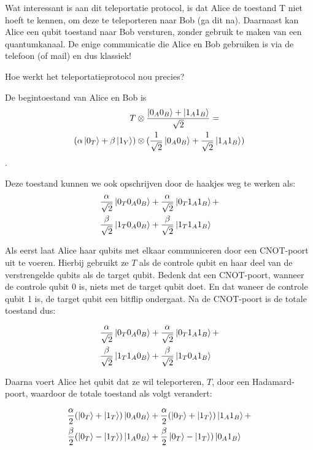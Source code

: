 \documentclass[../../main.tex]{subfiles}
\begin{document}
Wat interessant is aan dit teleportatie protocol, is dat Alice de toestand T niet hoeft te kennen, om deze te teleporteren naar Bob (ga dit na). Daarnaast kan Alice een qubit toestand naar Bob versturen, zonder gebruik te maken van een quantumkanaal. De enige communicatie die Alice en Bob gebruiken is via de telefoon (of mail) en dus klassiek!

Hoe werkt het teleportatieprotocol nou precies?

De begintoestand van Alice en Bob is
\begin{align*}
T &\otimes \frac{\ket{0_A0_B}+\ket{1_A1_B}}{\sqrt{2}}=\\ 
(\alpha\ket{0_T}+\beta\ket{1_Y}) &\otimes (\frac{1}{\sqrt{2}}\ket{0_A0_B}+\frac{1}{\sqrt{2}}\ket{1_A1_B})
\end{align*}.

Deze toestand kunnen we ook opschrijven door de haakjes weg te werken als:
\begin{align*}
\frac{\alpha}{\sqrt{2}}\ket{0_T0_A0_B} &+
\frac{\alpha}{\sqrt{2}}\ket{0_T1_A1_B} +\\
\frac{\beta}{\sqrt{2}}\ket{1_T0_A0_B} &+
\frac{\beta}{\sqrt{2}}\ket{1_T1_A1_B}
\end{align*}

Als eerst laat Alice haar qubits met elkaar communiceren door een CNOT-poort uit te voeren. Hierbij gebruikt ze $T$ als de controle qubit en haar deel van de verstrengelde qubits als de target qubit. Bedenk dat een CNOT-poort, wanneer de controle qubit 0 is, niets met de target qubit doet. En dat waneer de controle qubit 1 is, de target qubit een bitflip ondergaat. Na de CNOT-poort is de totale toestand dus:

\begin{align*}
\frac{\alpha}{\sqrt{2}}\ket{0_T0_A0_B} &+
\frac{\alpha}{\sqrt{2}}\ket{0_T1_A1_B} +\\
\frac{\beta}{\sqrt{2}}\ket{1_T1_A0_B} &+
\frac{\beta}{\sqrt{2}}\ket{1_T0_A1_B}
\end{align*}

Daarna voert Alice het qubit dat ze wil teleporteren, $T$, door een Hadamard-poort, waardoor de totale toestand als volgt verandert:

\begin{align*}
\frac{\alpha}{2}(\ket{0_T}+\ket{1_T})\ket{0_A0_B} &+
\frac{\alpha}{2}(\ket{0_T}+\ket{1_T})\ket{1_A1_B} +\\
\frac{\beta}{2}(\ket{0_T}-\ket{1_T})\ket{1_A0_B} &+ 
\frac{\beta}{2}\ket{0_T}-\ket{1_T})\ket{0_A1_B}
\end{align*}
\end{document}
